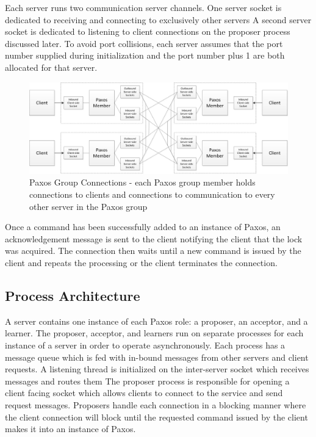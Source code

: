 \documentclass[11pt, onecolumn]{article}
\begin{document}
Each server runs two communication server channels.
One server socket is dedicated to receiving and connecting to exclusively other servers
A second server socket is dedicated to listening to client connections on the proposer process discussed later.
To avoid port collisions, each server assumes that the port number supplied during initialization and the port number plus 1 are both allocated for that server.

\begin{figure}
\includegraphics[width=6in]{paxos_group_connections.jpg}
\caption{Paxos Group Connections - each Paxos group member holds connections to clients and connections to communication to every other server in the Paxos group} 
\end{figure}

Once a command has been successfully added to an instance of Paxos, an acknowledgement message is sent to the client notifying the client that the lock was acquired. The connection then waits until a new command is issued by the client and repeats the processing or the client terminates the connection.

\subsection{Process Architecture}

A server contains one instance of each Paxos role: a proposer, an acceptor, and a learner.
The proposer, acceptor, and learners run on separate processes for each instance of a server in order to operate asynchronously.
Each process has a message queue which is fed with in-bound messages from other servers and client requests.
A listening thread is initialized on the inter-server socket which receives messages and routes them
The proposer process is responsible for opening a client facing socket which allows clients to connect to the service and send request messages.
Proposers handle each connection in a blocking manner where the client connection will block until the requested command issued by the client makes it into an instance of Paxos.
\end{document}
